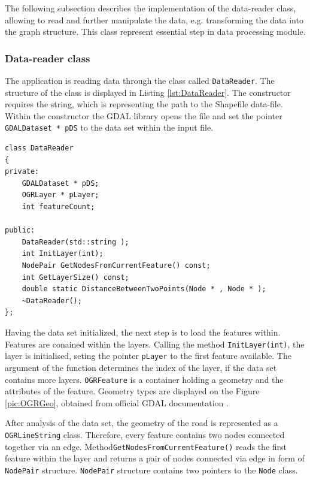 \documentclass[thesis=M,english]{FITthesis}[2012/10/20]
\begin{document}
The following subsection describes the implementation of the data-reader class, allowing to read and further manipulate the data, e.g. transforming the data into the graph structure. This class represent essential step in data processing module.

\subsubsection{Data-reader class}
The application is reading data through the class called \texttt{DataReader}. The structure of the class is displayed in Listing \ref{lst:DataReader}. The constructor requires the string, which is representing the path to the Shapefile data-file. Within the constructor the GDAL library opens the file and set the pointer \texttt{GDALDataset * pDS} to the data set within the input file.

\begin{lstlisting}[frame=single, caption={\texttt{DataReader} class}, label={lst:DataReader}]
class DataReader
{
private:
    GDALDataset * pDS;
    OGRLayer * pLayer;
    int featureCount;

public:
    DataReader(std::string );
    int InitLayer(int);
    NodePair GetNodesFromCurrentFeature() const;
    int GetLayerSize() const;
    double static DistanceBetweenTwoPoints(Node * , Node * );
    ~DataReader();
};
\end{lstlisting}

Having the data set initialized, the next step is to load the features within. Features are conained within the layers. Calling the method \texttt{InitLayer(int)}, the layer is initialised, seting the pointer \texttt{pLayer} to the first feature available. The argument of the function determines the index of the layer, if the data set contains more layers. \texttt{OGRFeature} is a container holding a geometry and the attributes of the feature. Geometry types are displayed on the Figure \ref{pic:OGRGeo}, obtained from official GDAL documentation \cite{GDAL17}. 



After analysis of the data set, the geometry of the road is represented as a \texttt{OGRLineString} class. Therefore, every feature contains two nodes connected together via an edge. Method\texttt{GetNodesFromCurrentFeature()} reads the first feature within the layer and returns a pair of nodes connected via edge in form of \texttt{NodePair} structure. \texttt{NodePair} structure contains two pointers to the \texttt{Node} class. 
\end{document}
